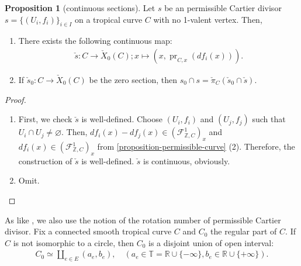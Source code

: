 \documentclass[a4paper,dvipdfmx,reqno,12pt]{amsart}
\theoremstyle{definition}
\newtheorem{proposition}[theorem]{Proposition}
\newcommand{\emp}{\varnothing}%
\newcommand{\opn}[1]{\operatorname{#1}}
\numberwithin{equation}{section}
\begin{document}
\begin{proposition}[{continuous sections}]
\label{proposition-permissible-section}
Let $s$ be an permissible Cartier divisor 
$s=\{(U_i,f_i)\}_{i\in I}$ on a tropical curve 
$C$ with no 1-valent vertex. 
Then, 
\begin{enumerate}
\item There exists the following continuous map:
\begin{align}
\check{s}\colon C\to \check{X}_0 (C); x
\mapsto (x,\opn{pr}_{C,x}(df_{i}(x))).
\end{align}
\item If $\check{s}_0\colon C\to \check{X}_0 (C)$ be the 
zero section, then $s_0\cap s=\check{\pi}_C(\check{s}_0\cap \check{s})$.
\end{enumerate}
\end{proposition}
\begin{proof}
\begin{enumerate}
\item First, we check $\check{s}$ is well-defined.
Choose $(U_i,f_i)$ and $(U_j,f_j)$ such that
$U_i\cap U_j\neq \emp$. 
Then, $df_i(x)-df_j(x)\in 
(\mathcal{F}_{\mathbb{Z},C}^{1})_x$ and
$df_i(x)\in (\mathcal{F}_{\mathbb{Z},C}^{1})_x$
from \cref{proposition-permissible-curve} (2).
Therefore, the construction of $\check{s}$ is well-defined.
$\check{s}$ is continuous, obviously.
\item Omit.
\end{enumerate}
\end{proof}


As like \cite{auroux2022lagrangian},
we also use the notion of the rotation number of 
permissible Cartier divisor.
Fix a connected smooth tropical curve $C$
 and $C_0$ the 
regular part of $C$.
If $C$ is not isomorphic to a circle, then
$C_0$ is a disjoint union of open interval:
\begin{align}
  C_0\simeq \coprod_{e\in E} (a_e,b_e), \quad
(a_e\in \mathbb{T}
=\mathbb{R}\cup\{-\infty\}, b_e\in \mathbb{R}\cup\{+\infty\}).
\end{align}
\end{document}
